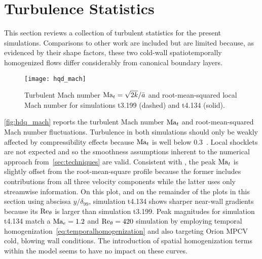 

\section{Turbulence Statistics}
\label{sec:bldata_stats}

This section reviews a collection of turbulent statistics for the present
simulations.  Comparisons to other work are included but are limited
because, as evidenced by their shape factors, these two cold-wall
spatiotemporally homogenized flows differ considerably from canonical boundary
layers.


\begin{figure}
\centering
\texttt{[image: hqd\_mach]}
\caption[Fluctuating Mach number profiles for simulations t3.199 and t4.134]{%
    Turbulent Mach number $\Mach[t]=\sqrt{2 k}/\bar{a}$
    and root-mean-squared local Mach number for simulations
    t3.199 (dashed) and t4.134 (solid).\label{fig:hdq_mach}
}
\end{figure}

\autoref{fig:hdq_mach} reports the turbulent Mach number $\Mach[t]{}$ and
root-mean-squared Mach number fluctuations.  Turbulence in both simulations
should only be weakly affected by compressibility effects because $\Mach[t]$ is
well below 0.3~\citep{Smits2005Turbulent}.  Local shocklets are not expected and
so the smoothness assumptions inherent to the numerical approach
from~\autoref{sec:techniques} are valid.  Consistent with
\citet{Guarini2000Direct}, the peak $\Mach[t]$ is slightly offset from the
root-mean-square profile because the former includes contributions from all
three velocity components while the latter uses only streamwise information.  On
this plot, and on the remainder of the plots in this section using abscissa
$y/\delta_{99}$, simulation t4.134 shows sharper near-wall gradients because its
$\Reynolds[\theta]$ is larger than simulation t3.199.  Peak magnitudes for
simulation t4.134 match a $\Mach[e]=1.2$ and $\Reynolds[\theta]{}=420$ simulation by
\citet{Topalian2014Temporal} employing temporal
homogenization~\eqref{eq:temporalhomogenization} and also targeting Orion MPCV
cold, blowing wall conditions.  The introduction of spatial homogenization terms
within the model seems to have no impact on these curves.

